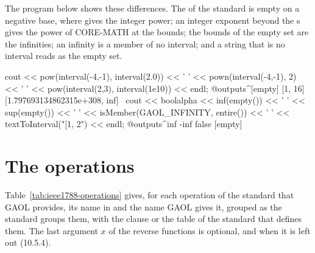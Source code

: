 \documentclass[12pt,a4paper,twoside,openright]{book}
\begin{document}
\begin{Ex}\label{ex:ieee1788-differences}
The program below shows these differences. The  of the standard is
empty on a negative base, where  gives the integer power; an
integer exponent beyond the s gives the power of CORE-MATH at the
bounds; the bounds of the empty set are the infinities; an infinity is a
member of no interval; and a string that is no interval reads as the empty
set.
\begin{example}
cout << pow(interval(-4,-1), interval(2.0)) << ' '
     << pown(interval(-4,-1), 2) << ' '
     << pow(interval(2,3), interval(1e10)) << endl;
@outputs^[empty] [1, 16] [1.797693134862315e+308, inf]~
cout << boolalpha << inf(empty()) << ' ' << sup(empty()) << ' '
     << isMember(GAOL_INFINITY, entire()) << ' '
     << textToInterval("[1, 2") << endl;
@outputs^inf -inf false [empty]~
\end{example}
\end{Ex}

\section{The operations}\label{sec:ieee1788-operations}
%

Table~\ref{tab:ieee1788-operations} gives, for each operation of the standard
that GAOL provides, its name in  and the name GAOL gives
it, grouped as the standard groups them, with the clause or the table of the
standard that defines them. The last argument $x$ of the reverse functions
is optional, and \itv{-\infty}{+\infty} when it is left out (10.5.4).
\end{document}

